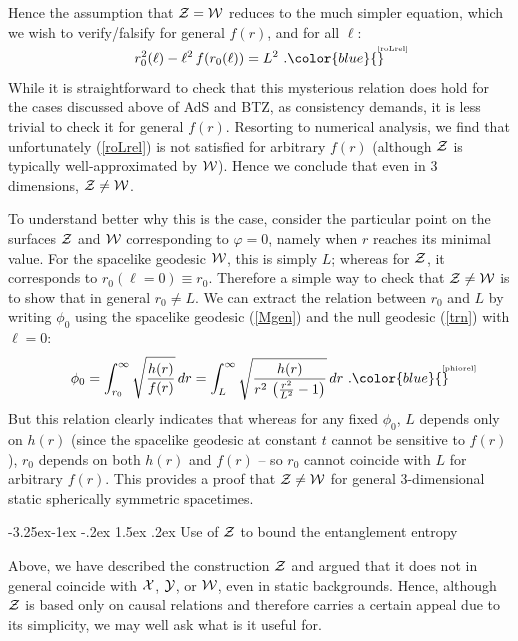 \documentclass[12pt]{article}
\makeatletter
\renewcommand\subsection{\@startsection{subsection}{2}{\z@}%
                                     {-3.25ex\@plus -1ex \@minus -.2ex}%
                                     {1.5ex \@plus .2ex}%
                                     {\normalfont\bfseries}}
\def\req#1{(\ref{#1})}
\def\({\left (}
\def\){\right )}
\def\ph{\varphi}
\def\l{\ell}
\def\CW{{\cal W}}
\def\CX{{\cal X}}
\def\CY{{\cal Y}}
\def\CZ{{\cal Z}}
\def\l{\ell}
\def\Label#1{\label{#1}%
{ \color{blue}{\smash{\hbox to0pt{\raise2ex\hbox{\tiny[#1]}\hss}}}}}
\def\Gms{\CW}
\def\Lms{\CY}
\def\Xms{\CX}
\def\Cms{\CZ}
\def\pho{\phi_0}
\def\ro{r_0}
\makeatother
\begin{document}
Hence the assumption that $\Cms=\Gms$ reduces to the much simpler equation, which we wish to verify/falsify for general $f(r)$, and for all $\l$:
%
\begin{equation}
\ro^2(\l) - \l^2 \,  f(\ro(\l) ) = L^2 \ .
\Label{roLrel}
\end{equation}
%
While it is straightforward to check that this mysterious relation does hold for the cases discussed above of AdS and BTZ, as consistency demands, it is less trivial to check it for general $f(r)$.
Resorting to numerical analysis, we find that unfortunately \req{roLrel} is not satisfied for arbitrary $f(r)$ (although $\Cms$ is typically well-approximated by $\Gms$).  Hence we conclude that even in 3 dimensions, $\Cms \ne \Gms$.

To understand better why this is the case, consider the particular point on the surfaces $\Cms$ and $\Gms$ corresponding to $\ph=0$, namely when $r$ reaches its minimal value.  For the spacelike geodesic $\Gms$, this is simply $L$; whereas for $\Cms$, it corresponds to $\ro(\l=0) \equiv \ro$.  Therefore a simple way to check that $\Cms \ne \Gms$ is to show that in general $\ro \ne L$.
We can extract the relation between $\ro$ and $L$ by writing $\pho$ using the spacelike geodesic \req{Mgen} and the null geodesic \req{trn} with $\l=0$:
%
\begin{equation}
\pho
= \int_{\ro}^{\infty}  \sqrt{{h(r)  \over f(r) }} \, dr
= \int_{L}^{\infty}  \sqrt{{h(r)  \over r^2 \, \({r^2 \over L^2} - 1 \) }} \, dr  \ .
\Label{phiorel}
\end{equation}
%
But this relation clearly indicates that whereas for any fixed $\pho$, $L$ depends only on $h(r)$ (since the spacelike geodesic at constant $t$ cannot be sensitive to $f(r)$), $\ro$ depends on both $h(r)$ and $f(r)$ -- so $\ro$ cannot coincide with $L$ for arbitrary $f(r)$.  This provides a proof that $\Cms \ne \Gms$ for general 3-dimensional static spherically symmetric spacetimes.

\subsection{Use of $\Cms$ to bound the entanglement entropy}

Above, we have described the construction $\Cms$ and argued that it does
not in general coincide with $\Xms$, $\Lms$, or $\Gms$, even in static backgrounds.
Hence, although  $\Cms$ is based only on causal relations and therefore carries a
certain appeal due to its simplicity, we may well ask what is it useful for.
\end{document}
